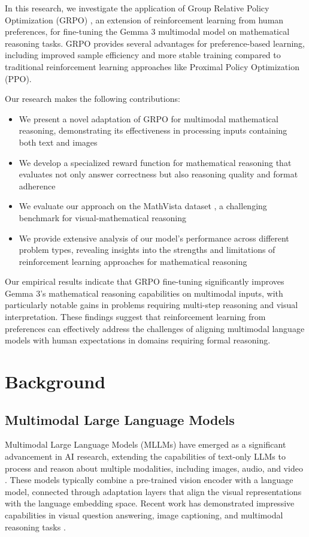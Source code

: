\documentclass[11pt,a4paper]{article}
\begin{document}
In this research, we investigate the application of Group Relative Policy Optimization (GRPO) \cite{azar2023general}, an extension of reinforcement learning from human preferences, for fine-tuning the Gemma 3 multimodal model on mathematical reasoning tasks. GRPO provides several advantages for preference-based learning, including improved sample efficiency and more stable training compared to traditional reinforcement learning approaches like Proximal Policy Optimization (PPO).

Our research makes the following contributions:

\begin{itemize}
    \item We present a novel adaptation of GRPO for multimodal mathematical reasoning, demonstrating its effectiveness in processing inputs containing both text and images
    \item We develop a specialized reward function for mathematical reasoning that evaluates not only answer correctness but also reasoning quality and format adherence
    \item We evaluate our approach on the MathVista dataset \cite{mathvista2023}, a challenging benchmark for visual-mathematical reasoning
    \item We provide extensive analysis of our model's performance across different problem types, revealing insights into the strengths and limitations of reinforcement learning approaches for mathematical reasoning
\end{itemize}

Our empirical results indicate that GRPO fine-tuning significantly improves Gemma 3's mathematical reasoning capabilities on multimodal inputs, with particularly notable gains in problems requiring multi-step reasoning and visual interpretation. These findings suggest that reinforcement learning from preferences can effectively address the challenges of aligning multimodal language models with human expectations in domains requiring formal reasoning.

\section{Background}

\subsection{Multimodal Large Language Models}

Multimodal Large Language Models (MLLMs) have emerged as a significant advancement in AI research, extending the capabilities of text-only LLMs to process and reason about multiple modalities, including images, audio, and video \cite{alayrac2022flamingo, liu2023visual}. These models typically combine a pre-trained vision encoder with a language model, connected through adaptation layers that align the visual representations with the language embedding space. Recent work has demonstrated impressive capabilities in visual question answering, image captioning, and multimodal reasoning tasks \cite{li2023blip, awadalla2023openflamingo}.
\end{document}
